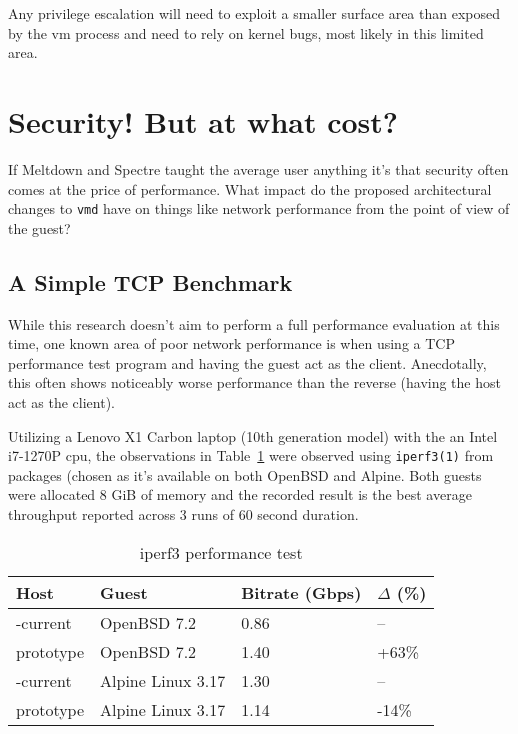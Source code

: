 \documentclass[conference]{IEEEtran}
\begin{document}
Any privilege escalation will need to exploit a smaller surface area
than exposed by the vm process and need to rely on kernel bugs, most
likely in this limited area.


\vspace{5mm}
\section{Security! But at what cost?}
If Meltdown and Spectre taught the average user anything it's that
security often comes at the price of performance. What impact do the
proposed architectural changes to \texttt{vmd} have on things like
network performance from the point of view of the guest?

\vspace{3mm}
\subsection{A Simple TCP Benchmark}
While this research doesn't aim to perform a full performance
evaluation at this time, one known area of poor network performance is
when using a TCP performance test program and having the guest act as
the client. Anecdotally, this often shows noticeably worse performance
than the reverse (having the host act as the client).

Utilizing a Lenovo X1 Carbon laptop (10th generation model) with the
an Intel i7-1270P cpu, the observations in Table~\ref{perf} were
observed using \texttt{iperf3(1)} from packages (chosen as it's
available on both OpenBSD and Alpine. Both guests were allocated 8 GiB
of memory and the recorded result is the best average throughput
reported across 3 runs of 60 second duration.

\vspace{2mm}
\begin{table}
\begin{center}
\caption{\label{perf}iperf3 performance test}
\begin{tabular}{| l | l | l | l |}
  \hline
  Host & Guest & Bitrate (Gbps) & $\Delta$ (\%) \\ \hline
  -current & OpenBSD 7.2 & 0.86 & -- \\ \hline
  prototype & OpenBSD 7.2 & 1.40 & +63\% \\ \hline
  -current & Alpine Linux 3.17 & 1.30 & --  \\ \hline
  prototype & Alpine Linux 3.17 & 1.14 & -14\%  \\ \hline
\end{tabular}
\end{center}
\end{table}
\vspace{2mm}
\end{document}
